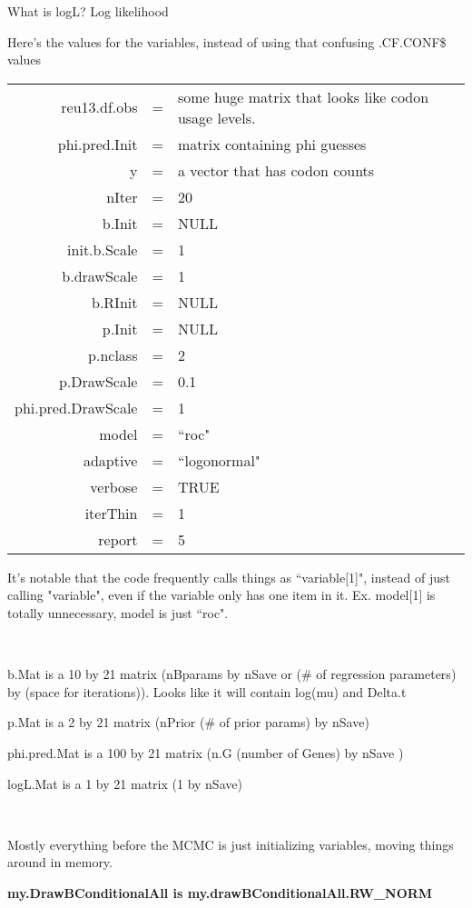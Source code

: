 \documentclass[11pt]{article} %
\begin{document}
What is logL? Log likelihood


Here's the values for the variables, instead of using that confusing .CF.CONF\$ values

\begin{tabular}{rll}
reu13.df.obs & = & some huge matrix that looks like codon usage levels.\\
phi.pred.Init & = & matrix containing phi guesses \\
y & = & a vector that has codon counts \\
nIter & = & 20 \\
b.Init & = & NULL \\
init.b.Scale & = & 1 \\
b.drawScale & = & 1 \\
b.RInit & = & NULL \\
p.Init & = & NULL \\
p.nclass & = & 2 \\
p.DrawScale & = & 0.1 \\
phi.pred.DrawScale & = & 1 \\
model & = & ``roc" \\
adaptive & = & ``logonormal" \\
verbose & = & TRUE \\
iterThin & = & 1 \\
report & = & 5
\end{tabular}

It's notable that the code frequently calls things as ``variable[1]", instead of just calling "variable", even if the variable only has one item in it. Ex. model[1] is totally unnecessary, model is just ``roc".

~

b.Mat is a 10 by 21 matrix (nBparams by nSave or  (\# of regression parameters) by (space for iterations)). Looks like it will contain log(mu) and Delta.t

p.Mat is a 2 by 21 matrix (nPrior (\# of prior params) by nSave)

phi.pred.Mat is a 100 by 21 matrix (n.G (number of Genes) by nSave )

logL.Mat is a 1 by 21 matrix (1 by nSave)

~

Mostly everything before the MCMC is just initializing variables, moving things around in memory. 

\textbf{my.DrawBConditionalAll is my.drawBConditionalAll.RW\_NORM}
\end{document}

